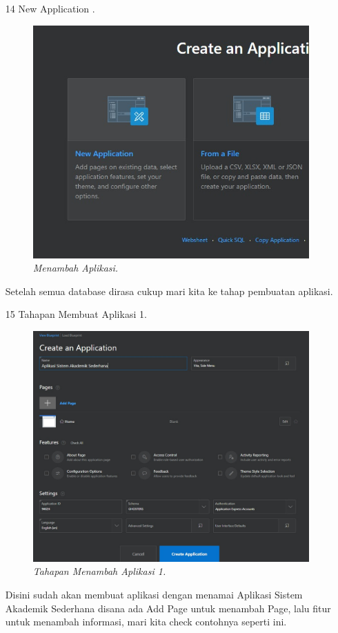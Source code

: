 \begin{enumerate}
\item[14]New Application .
\begin{figure}[!htbp]
    \begin{center}
    \includegraphics[scale=0.4]{figures/8.jpg}
    \caption{\textit{Menambah Aplikasi.}}
    \end{center}
\end{figure}
\par Setelah semua database dirasa cukup mari kita ke tahap pembuatan aplikasi.


\item[15]Tahapan Membuat Aplikasi 1.
\begin{figure}[!htbp]
    \begin{center}
    \includegraphics[scale=0.3]{figures/9.jpg}
    \caption{\textit{Tahapan Menambah Aplikasi 1.}}
    \end{center}
\end{figure}
\par Disini sudah akan membuat aplikasi dengan menamai Aplikasi Sistem Akademik Sederhana disana ada Add Page untuk menambah Page, lalu fitur untuk menambah informasi, mari kita check contohnya seperti ini.


\end{enumerate}
